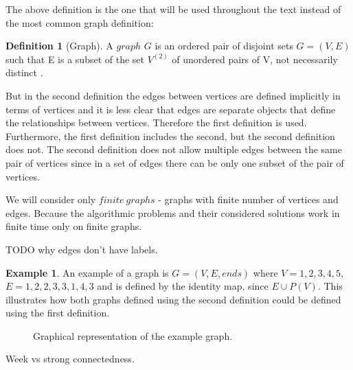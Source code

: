 \documentclass{report}
\theoremstyle{plain}
\theoremstyle{definition}
\newtheorem{definition}{Definition}
\newtheorem{example}{Example}
\theoremstyle{remark}
\numberwithin{definition}{chapter}
\numberwithin{example}{chapter}
\numberwithin{figure}{chapter}
\begin{document}
The above definition is the one that will be used throughout the text instead of the most common graph definition:

\begin{definition}[Graph]
A $graph$  $G$ is an ordered pair of disjoint sets $G = (V, E)$ such that E is a subset of the set $V^{(2)}$ of unordered pairs of V, not necessarily distinct \cite{bollobas1998modern}. 
\end{definition} 

But in the second definition the edges between vertices are defined implicitly in terms of vertices and it is less clear that edges are separate objects that define the relationships between vertices. Therefore the first definition is used. Furthermore, the first definition includes the second, but the second definition does not. The second definition does not allow multiple edges between the same pair of vertices since in a set of edges there can be only one subset of the pair of vertices.

We will consider only $finite \ graphs$ - graphs with finite number of vertices and edges. Because the algorithmic problems and their considered solutions work in finite time only on finite graphs.

TODO why edges don't have labels.

\begin{example}
An example of a graph is $G=(V, E, ends)$ where $V={1,2,3,4,5}$, $E={{1,2}, {2,3}, {3,1}, {4,3}}$ and is defined by the identity map, since $E \cup P(V)$. This illustrates how both graphs defined using the second definition could be defined using the first definition.

\SetVertexNormal[Shape      = circle,
                 FillColor  = blue!20,
                 LineWidth  = 2pt]
\SetUpEdge[lw         = 3pt,
           color      = black,
           labelcolor = white,
           labeltext  = red,
           labelstyle = {sloped,draw,text=blue}]
\begin{figure}[h]
\center
{}
\caption{Graphical representation of the example graph.}
\end{figure}
\end{example}

Week vs strong connectedness.
\end{document}

